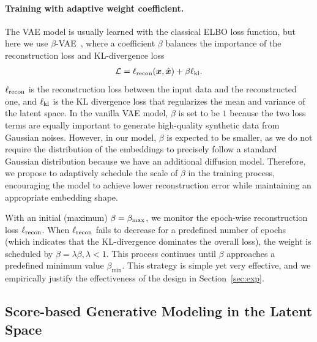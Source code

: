 \paragraph{Training with adaptive weight coefficient.} The VAE model is usually learned with the classical ELBO loss function, but here we use $\beta$-VAE~\citep{beta-vae}, where a coefficient $\beta$ balances the importance of the reconstruction loss and KL-divergence loss
\begin{equation}\label{eqn:beta-vae}
\begin{split}
    {\mathcal{L}} = \ell_{\rm {recon}} ({\bm{x}}, \hat{{\bm{x}}}) + \beta \ell_{\rm kl}.
\end{split}
\end{equation}
$\ell_{\rm recon}$ is the reconstruction loss between the input data and the reconstructed one, and $\ell_{\rm kl}$ is the KL divergence loss that regularizes the mean and variance of the latent space. In the vanilla VAE model, $\beta$ is set to be $1$ because the two loss terms are equally important to generate high-quality synthetic data from Gaussian noises. However, in our model, $\beta$ is expected to be smaller, as we do not require the distribution of the embeddings to precisely follow a standard Gaussian distribution because we have an additional diffusion model. Therefore, we propose to adaptively schedule the scale of $\beta$  in the training process, encouraging the model to achieve lower reconstruction error while maintaining an appropriate embedding shape.

With an initial (maximum) $\beta = \beta_{\rm max}$, we monitor the epoch-wise reconstruction loss $\ell_{\rm recon}$. When $\ell_{\rm recon} $ fails to decrease for a predefined number of epochs (which indicates that the KL-divergence dominates the overall loss), the weight is scheduled by $\beta = \lambda \beta, \lambda < 1$. This process continues until $\beta$ approaches a predefined minimum value $\beta_{\min}$. This strategy is simple yet very effective, and we empirically justify the effectiveness of the design in Section~\ref{sec:exp}.

\subsection{Score-based Generative Modeling in the Latent Space}\label{sec:diffusion}
